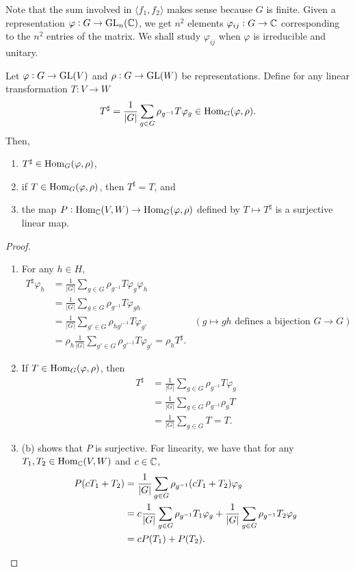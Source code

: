 		Note that the sum involved in $\langle f_1,f_2\rangle$ makes sense because $G$ is finite. Given a representation $\varphi : G \to \operatorname{GL}_n(\mathbb{C})$, we get $n^2$ elements $\varphi_{ij} : G \to \mathbb{C}$ corresponding to the $n^2$ entries of the matrix. We shall study $\varphi_{ij}$ when $\varphi$ is irreducible and unitary.

		\begin{fprop}
			Let $\varphi : G \to \operatorname{GL}(V)$ and $\rho : G \to \operatorname{GL}(W)$ be representations. Define for any linear transformation $T : V \to W$
			\[ T^\sharp = \frac{1}{|G|} \sum_{g \in G} \rho_{g^{-1}} T \varphi_g \in \operatorname{Hom}_G(\varphi,\rho). \]
			Then,
			\begin{enumerate}[label=(\alph*)]
				\item $T^\sharp \in \operatorname{Hom}_G(\varphi,\rho)$,
				\item if $T \in \operatorname{Hom}_G(\varphi,\rho)$, then $T^\sharp = T$, and
				\item the map $P : \operatorname{Hom}_{\mathbb{C}}(V,W) \to \operatorname{Hom}_G(\varphi,\rho)$ defined by $T \mapsto T^\sharp$ is a surjective linear map.
			\end{enumerate}
		\end{fprop}
		\begin{proof}
			\phantom{pain}
			\begin{enumerate}
				\item For any $h \in H$,
				\begin{align*}
					T^\sharp \varphi_h &= \frac{1}{|G|} \sum_{g \in G} \rho_{g^{-1}} T \varphi_g \varphi_h \\
						&= \frac{1}{|G|} \sum_{g \in G} \rho_{g^{-1}} T \varphi_{gh} \\
						&= \frac{1}{|G|} \sum_{g' \in G} \rho_{hg'^{-1}} T \varphi_{g'} & (g \mapsto gh \text{ defines a bijection }G\to G) \\
						&= \rho_h \frac{1}{|G|} \sum_{g' \in G} \rho_{g'^{-1}} T \varphi_{g'} = \rho_h T^\sharp.
				\end{align*}

				\item If $T \in \operatorname{Hom}_G(\varphi,\rho)$, then
				\begin{align*}
					T^\sharp &= \frac{1}{|G|} \sum_{g \in G} \rho_{g^{-1}} T \varphi_g \\
						&= \frac{1}{|G|} \sum_{g \in G} \rho_{g^{-1}} \rho_g T \\
						&= \frac{1}{|G|} \sum_{g \in G} T = T.
				\end{align*}

				\item (b) shows that $P$ is surjective. For linearity, we have that for any $T_1,T_2 \in \operatorname{Hom}_{\mathbb{C}}(V,W)$ and $c \in \mathbb{C}$,
				\begin{align*}
					P(cT_1 + T_2) &= \frac{1}{|G|} \sum_{g \in G} \rho_{g^{-1}} (cT_1 + T_2) \varphi_g \\
						&= c \frac{1}{|G|} \sum_{g \in G} \rho_{g^{-1}} T_1 \varphi_g + \frac{1}{|G|} \sum_{g \in G} \rho_{g^{-1}} T_2 \varphi_g \\
						&= cP(T_1) + P(T_2). \qedhere
				\end{align*}
			\end{enumerate}
		\end{proof}

